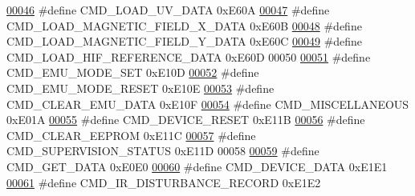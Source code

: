\begin{DoxyCode}
\hypertarget{a00031_source_l00046}{}\hyperlink{a00031_a8904f57ef5850374dbcdbe67eb8a5543}{00046} \textcolor{preprocessor}{#define CMD\_LOAD\_UV\_DATA                                        0xE60A}
\hypertarget{a00031_source_l00047}{}\hyperlink{a00031_a9e5d9d302e44daccbe233d321696b12c}{00047} \textcolor{preprocessor}{#define CMD\_LOAD\_MAGNETIC\_FIELD\_X\_DATA                          0xE60B}
\hypertarget{a00031_source_l00048}{}\hyperlink{a00031_ace011e2ba41b184650e8bd0ddbfa00d2}{00048} \textcolor{preprocessor}{#define CMD\_LOAD\_MAGNETIC\_FIELD\_Y\_DATA                          0xE60C}
\hypertarget{a00031_source_l00049}{}\hyperlink{a00031_afc4f83cb04e57ee185a039b10e19e297}{00049} \textcolor{preprocessor}{#define CMD\_LOAD\_HIF\_REFERENCE\_DATA                             0xE60D}
00050 
\hypertarget{a00031_source_l00051}{}\hyperlink{a00031_ac80fdfdbada05f61256bef39c2064330}{00051} \textcolor{preprocessor}{#define CMD\_EMU\_MODE\_SET                                        0xE10D}
\hypertarget{a00031_source_l00052}{}\hyperlink{a00031_a48532ee6ce8c4c41bc6a972f66998ca6}{00052} \textcolor{preprocessor}{#define CMD\_EMU\_MODE\_RESET                                      0xE10E}
\hypertarget{a00031_source_l00053}{}\hyperlink{a00031_aa5f71f685588bc4e978cd6d595a5ea81}{00053} \textcolor{preprocessor}{#define CMD\_CLEAR\_EMU\_DATA                                      0xE10F}
\hypertarget{a00031_source_l00054}{}\hyperlink{a00031_a1c028104d44ece3aca38373da0345c04}{00054} \textcolor{preprocessor}{#define CMD\_MISCELLANEOUS                                       0xE01A}
\hypertarget{a00031_source_l00055}{}\hyperlink{a00031_ac4c8a78ea50054745a0ac0792baa7657}{00055} \textcolor{preprocessor}{#define CMD\_DEVICE\_RESET                                        0xE11B}
\hypertarget{a00031_source_l00056}{}\hyperlink{a00031_a9084e0a84e73318b6fad9841fb4d4f98}{00056} \textcolor{preprocessor}{#define CMD\_CLEAR\_EEPROM                                        0xE11C}
\hypertarget{a00031_source_l00057}{}\hyperlink{a00031_ad6af9210ac0903986f3ac3e55c6816a3}{00057} \textcolor{preprocessor}{#define CMD\_SUPERVISION\_STATUS                                  0xE11D}
00058 
\hypertarget{a00031_source_l00059}{}\hyperlink{a00031_af89ae6f2252e558fc6e54ea9b452bf0e}{00059} \textcolor{preprocessor}{#define CMD\_GET\_DATA                                            0xE0E0}
\hypertarget{a00031_source_l00060}{}\hyperlink{a00031_a4412fcb90fb9171d432a624428881e70}{00060} \textcolor{preprocessor}{#define CMD\_DEVICE\_DATA                                         0xE1E1}
\hypertarget{a00031_source_l00061}{}\hyperlink{a00031_ad37cd290161f0a245d189c3f4e014d4e}{00061} \textcolor{preprocessor}{#define CMD\_IR\_DISTURBANCE\_RECORD                               0xE1E2}

\end{DoxyCode}
